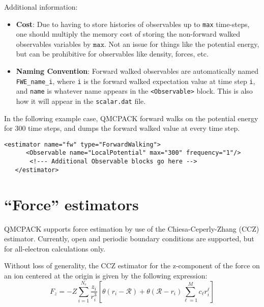 Additional information:
\begin{itemize}
  \item{\textbf{Cost}:  Due to having to store histories of observables up to \texttt{max} time-steps, one should multiply the memory cost of storing the non-forward walked observables variables by $\texttt{max}$.  Not an issue for things like the potential energy, but can be prohibitive for observables like density, forces, etc.  }
  \item{\textbf{Naming Convention}: Forward walked observables are automatically named \texttt{FWE\_name\_i}, where \texttt{i} is the forward walked expectation value at time step \texttt{i}, and \texttt{name} is whatever name appears in the \texttt{<Observable>} block.  This is also how it will appear in the \texttt{scalar.dat} file.  }
\end{itemize}

In the following example case, QMCPACK forward walks on the potential energy for 300 time steps, and dumps the forward walked value at every time step.  

\begin{lstlisting}[caption=Forward walking estimator element.]
  <estimator name="fw" type="ForwardWalking">
      <Observable name="LocalPotential" max="300" frequency="1"/>
       <!--- Additional Observable blocks go here -->
   </estimator>
\end{lstlisting}






\section{``Force'' estimators} \label{sec:force_est}

QMCPACK supports force estimation by use of the Chiesa-Ceperly-Zhang (CCZ) estimator.  Currently, open and periodic boundary conditions are supported, but for all-electron calculations only.  

Without loss of generality, the CCZ estimator for the z-component of the force on an ion centered at the origin is given by the following expression:
\begin{equation}
F_z = -Z \sum_{i=1}^{N_e}\frac{z_i}{r_i^3}[\theta(r_i-\mathcal{R}) + \theta(\mathcal{R}-r_i)\sum_{\ell=1}^{M}c_\ell r_i^\ell]
\end{equation}

